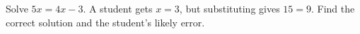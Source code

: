 Solve $5x=4x-3$. A student gets $x=3$, but substituting gives $15=9$. Find the correct solution and the student's likely error.
